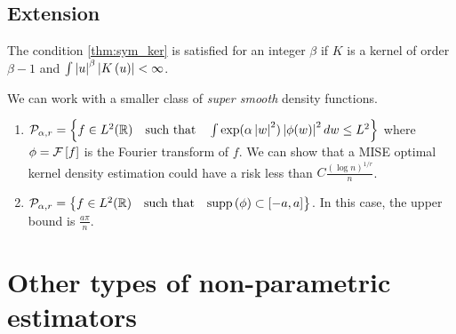 \subsection{Extension}
\begin{remark}
  The condition \ref{thm:sym_ker} is satisfied for an integer $\beta$ if $K$ is a kernel of order $\beta-1$ and $\int \left| u\right|^\beta \left| K\left(u\right)\right|<\infty$.
\end{remark}
\begin{remark}
  We can work with a smaller class of \textit{super smooth} density functions.
  \begin{enumerate}
    \item $\mathcal{P}_{\alpha,r}=\left\{f\in L^2(\mathbb{R}) \quad \text{such that} \quad \int \exp(\alpha\left| w\right|^2)\left| \phi(w)\right|^2 dw \le L^2\right\}$ where $\phi=\mathcal{F}\left[f\right]$ is the Fourier transform of $f$. We can show that a MISE optimal kernel density estimation could have a risk less than $C\frac{(\log n)^{1/r}}{n}$.
    \item $\mathcal{P}_{\alpha,r}=\left\{f\in L^2(\mathbb{R}) \quad \text{such that} \quad \text{supp}\left(\phi\right)\subset\left[-a,a\right]\right\}$. In this case, the upper bound is $\frac{a\pi}{n}$.
  \end{enumerate}
\end{remark}

\section{Other types of non-parametric estimators}
